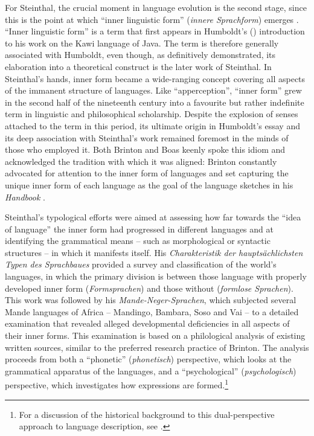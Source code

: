 \documentclass[output=paper]{langscibook}
\begin{document}
For Steinthal, the crucial moment in language evolution is the second stage, since this is the point at which ``inner linguistic form'' (\emph{innere Sprachform}) emerges \citep[425-426]{Steinthal1881}. ``Inner linguistic form'' is a term that first appears in Humboldt's (\citeyear{Humboldt19981836}) introduction to his work on the Kawi language of Java. The term is therefore generally associated with Humboldt, even though, as \citet{Borsche1989} definitively demonstrated, its elaboration into a theoretical construct is the later work of Steinthal. In Steinthal's hands, inner form became a wide-ranging concept covering all aspects of the immanent structure of languages. Like ``apperception'', ``inner form'' grew in the second half of the nineteenth century into a favourite but rather indefinite term in linguistic and philosophical scholarship. Despite the explosion of senses attached to the term in this period, its ultimate origin in Humboldt's essay and its deep association with Steinthal's work remained foremost in the minds of those who employed it. Both Brinton and Boas keenly spoke this idiom and acknowledged the tradition with which it was aligned: Brinton constantly advocated for attention to the inner form of languages and \citet[81]{Boas1911} set capturing the unique inner form of each language as the goal of the language sketches in his \emph{Handbook} \citep[cf.][98-105]{Darnell1988}. 

Steinthal's typological efforts were aimed at assessing how far towards the ``idea of language'' the inner form had progressed in different languages and at identifying the grammatical means – such as morphological or syntactic structures – in which it manifests itself. His \citeyear{Steinthal1860} \emph{Charakteristik der hauptsächlichsten Typen des Sprachbaues} provided a survey and classification of the world's languages, in which the primary division is between those language with properly developed inner form (\emph{Formsprachen}) and those without (\emph{formlose Sprachen}). This work was followed by his \citeyear{Steinthal1867} \emph{Mande-Neger-Sprachen}, which subjected several Mande languages of Africa – Mandingo, Bambara, Soso and Vai – to a detailed examination that revealed alleged developmental deficiencies in all aspects of their inner forms. This examination is based on a philological analysis of existing written sources, similar to the preferred research practice of Brinton. The analysis proceeds from both a ``phonetic'' (\emph{phonetisch}) perspective, which looks at the grammatical apparatus of the languages, and a ``psychological'' (\emph{psychologisch}) perspective, which investigates how expressions are formed.\footnote{For a discussion of the historical background to this dual-perspective approach to language description, see \citet[2-6]{McElvenny2017}.}
\end{document}
